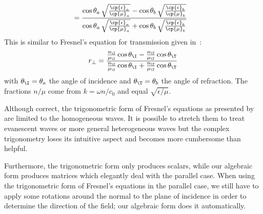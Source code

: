 \begin{refsection}
\begin{subequations}
\begin{align}
{        }
        \\
        &=
        \frac{
            \cos\theta_a \, \sqrt{\frac{\cp{\epsilon}_a}{\cp{\mu}_a}}
            -
            \cos\theta_b \, \sqrt{\frac{\cp{\epsilon}_b}{\cp{\mu}_b}}
        }{
            \cos\theta_a \, \sqrt{\frac{\cp{\epsilon}_a}{\cp{\mu}_a}}
            +
            \cos\theta_b \, \sqrt{\frac{\cp{\epsilon}_b}{\cp{\mu}_b}}
        }
    \end{align}
\end{subequations}
This is similar to Fresnel's equation for transmission given
in~\textcite{hecht2002optics}:
\begin{equation}
    r_\perp
    =
    \frac{
        \frac{n_\I}{\mu_\I} \cos \theta_\I
        -
        \frac{n_\T}{\mu_\T} \cos \theta_\T
    }{
        \frac{n_\I}{\mu_\I} \cos \theta_\I
        +
        \frac{n_\T}{\mu_\T} \cos \theta_\T
    }
\end{equation}
with $\theta_\I=\theta_a$ the angle of incidence and $\theta_\T=\theta_b$ the angle of refraction.
The fractions $n/\mu$ come from $k=\omega n/c_0$ and equal $\sqrt{\epsilon/\mu}$.

Although correct, the trigonometric form of Fresnel's equations as presented by~\textcite{hecht2002optics} are limited to the homogeneous waves.
It is possible to stretch them to treat evanescent waves or more general heterogeneous waves but the complex trigonometry loses its intuitive aspect and becomes more cumbersome than helpful.

Furthermore, the trigonometric form only produces scalars, while our algebraic form produces matrices which elegantly deal with the parallel case.
When using the trigonometric form of Fresnel's equations in the parallel case, we still have to apply some rotations around the normal to the plane of incidence in order to determine the direction of the field;
our algebraic form does it automatically.


\end{refsection}
